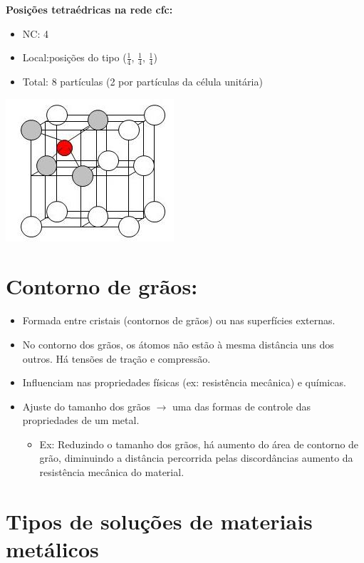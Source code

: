 \textbf{ Posições tetraédricas na rede cfc:}

\begin{itemize}
	
	\setlength{\parskip}{0pt}
	\setlength{\itemsep}{0pt plus 1pt}
	
	\item NC: 4
	\item Local:posições do tipo ($\frac{1}{4}$, $\frac{1}{4}$, $\frac{1}{4}$)
	\item Total: 8 partículas (2 por partículas	da célula unitária)
\end{itemize}

\includegraphics[scale=0.5,trim={0 0 0 0}]{figures/tetcfc}



\section{Contorno de grãos:}

\begin{itemize}
	\item Formada entre cristais (contornos de grãos) ou nas superfícies externas.
	\item No contorno dos grãos, os átomos não estão à mesma distância uns dos outros. Há tensões de tração e compressão.
	\item Influenciam nas propriedades físicas (ex: resistência mecânica) e químicas.
	\item Ajuste do tamanho dos grãos $\rightarrow$ uma das formas de controle das propriedades de um metal.
	\begin{itemize}
		\item Ex: Reduzindo o tamanho dos grãos, há aumento do área de contorno de grão, diminuindo a distância percorrida pelas discordâncias aumento da resistência mecânica do material.
	\end{itemize}
\end{itemize}


\section{Tipos de soluções de materiais metálicos}

